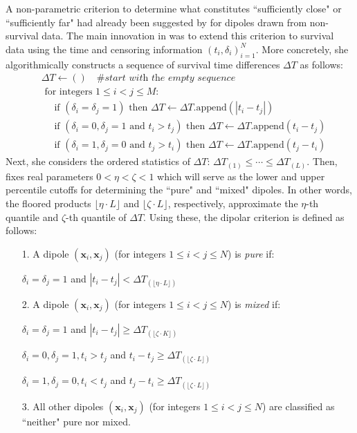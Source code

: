 \documentclass[12pt]{amsart}
\theoremstyle{definition}
\theoremstyle{plain}
\theoremstyle{remark}
\begin{document}
A non-parametric criterion to determine what constitutes ``sufficiently close" or ``sufficiently far" had already been suggested by \cite{bobrowskikretowski} for dipoles drawn from non-survival data. The main innovation in \cite{kretowska} was to extend this criterion to survival data using the time and censoring information $(t_i, \delta_i)_{i = 1}^N$. More concretely, she algorithmically constructs a sequence of survival time differences $\Delta T$ as follows:
\begin{align*}
&\Delta T \leftarrow () \quad \textit{\# start with the empty sequence} \\
&\text{ for integers } 1 \leq i < j \leq M: \\
&\quad \text{ if } (\delta_i = \delta_j = 1) \text{ then } \Delta T \leftarrow \Delta T.\text{append}(|t_i - t_j|) \\
&\quad \text{ if } (\delta_i = 0, \delta_j = 1 \text{ and } t_i > t_j) \text{ then } \Delta T \leftarrow \Delta T.\text{append}(t_i - t_j) \\
&\quad \text{ if } (\delta_i = 1, \delta_j = 0 \text{ and } t_j > t_i) \text{ then } \Delta T \leftarrow \Delta T.\text{append}(t_j - t_i)
\end{align*} Next, she considers the ordered statistics of $\Delta T$: $\Delta T_{(1)} \leq \cdots \leq \Delta T_{(L)}$. Then, \cite{kretowska} fixes real parameters $0 < \eta < \zeta < 1$ which will serve as the lower and upper percentile cutoffs for determining the ``pure" and ``mixed" dipoles. In other words, the floored products $\lfloor \eta \cdot L \rfloor$ and $\lfloor \zeta \cdot L \rfloor$, respectively, approximate the $\eta$-th quantile and $\zeta$-th quantile of $\Delta T$. Using these, the dipolar criterion is defined as follows:
\begin{itemize}
	\item[1.] A dipole $(\mathbf{x}_i, \mathbf{x}_j)$ (for integers $1 \leq i < j \leq N$) is \emph{pure} if:
	
	$\delta_i = \delta_j = 1$ and $|t_i - t_j| < \Delta T_{(\lfloor \eta \cdot L \rfloor)}$
	
	\item[2.] A dipole $(\mathbf{x}_i, \mathbf{x}_j)$ (for integers $1 \leq i < j \leq N$) is \emph{mixed} if:
	
	$\delta_i = \delta_j = 1$ and $|t_i - t_j| \geq \Delta T_{(\lfloor \zeta \cdot K \rfloor)}$
	
	$\delta_i = 0, \delta_j = 1, t_i > t_j$ and $t_i - t_j \geq \Delta T_{(\lfloor \zeta \cdot L \rfloor)}$
	
	$\delta_i = 1, \delta_j = 0, t_i < t_j$ and $t_j - t_i \geq \Delta T_{(\lfloor \zeta \cdot L \rfloor)}$
	
	\item[3.] All other dipoles $(\mathbf{x}_i, \mathbf{x}_j)$ (for integers $1 \leq i < j \leq N$) are classified as ``neither" pure nor mixed.
\end{itemize}
\end{document}
